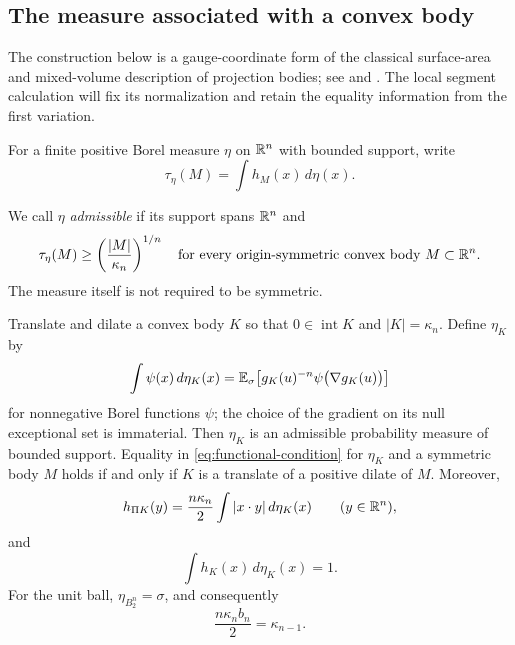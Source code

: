 \subsection{The measure associated with a convex body}

The construction below is a gauge-coordinate form of the classical
surface-area and mixed-volume description of projection bodies;
see \cite[Section~6]{Gardner2002} and \cite[Section~1]{Saroglou2015}.
The local segment calculation will fix its normalization and retain
the equality information from the first variation.

For a finite positive Borel measure $\eta$ on $\mathbb R^n$ with bounded
support, write
\[
 \tau_\eta(M)=\int h_M(x)\,d\eta(x).
\]
\begin{definition}\label{def:admissible-measure}
We call $\eta$ \emph{admissible} if its support spans $\mathbb R^n$ and
\begin{equation}\label{eq:functional-condition}
 \tau_\eta(M)\ge\left(\frac{|M|}{\kappa_n}\right)^{1/n}
 \quad\text{for every origin-symmetric convex body }M\subset\mathbb R^n.
\end{equation}
The measure itself is not required to be symmetric.
\end{definition}

\begin{proposition}\label{prop:projection-measure}
Translate and dilate a convex body $K$ so that $0\in\operatorname{int}K$
and $|K|=\kappa_n$.  Define $\eta_K$ by
\begin{equation}\label{eq:eta-definition}
 \int \psi(x)\,d\eta_K(x)
 =\mathbb E_{\sigma}\!\left[g_K(u)^{-n}\psi\bigl(\nabla g_K(u)\bigr)\right]
\end{equation}
for nonnegative Borel functions $\psi$; the choice of the gradient on
its null exceptional set is immaterial.  Then $\eta_K$ is an
admissible probability measure of bounded support.  Equality in
\eqref{eq:functional-condition} for $\eta_K$ and a symmetric body
$M$ holds if and only if $K$ is a translate of a positive dilate of
$M$.  Moreover,
\begin{equation}\label{eq:projection-measure}
 h_{\Pi K}(y)=\frac{n\kappa_n}{2}
                  \int |x\cdot y|\,d\eta_K(x)
 \qquad(y\in\mathbb R^n),
\end{equation}
and
\begin{equation}\label{eq:eta-normalization}
 \int h_K(x)\,d\eta_K(x)=1.
\end{equation}
For the unit ball, $\eta_{B_2^n}=\sigma$, and consequently
\begin{equation}\label{eq:ball-constant}
 \frac{n\kappa_n b_n}{2}=\kappa_{n-1}.
\end{equation}
\end{proposition}

